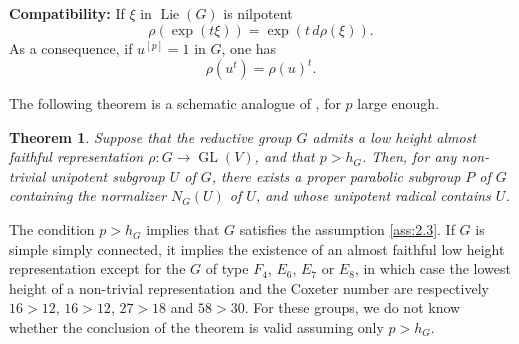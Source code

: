 \documentclass[11pt,a4paper]{article}
\theoremstyle{plain}
\newtheorem{theorem}{Theorem}[section]
\theoremstyle{definition}
\DeclareMathOperator{\Lie}{Lie}
\DeclareMathOperator{\GL}{GL}
\begin{document}
\subsection{} \label{sec:4.6}
\textbf{Compatibility:} If $\xi$ in $\Lie(G)$ is nilpotent
\begin{equation} \label{eq:4.6.1}
\rho(\exp(t\xi)) = \exp(t\, d\rho(\xi)).
\end{equation}
As a consequence, if $u^{[p]} = 1$ in $G$, one has
\begin{equation} \label{eq:4.6.2}
\rho(u^t) = \rho(u)^t.
\end{equation}

The following theorem is a schematic analogue of \cite{BT}, for $p$ large enough.

\begin{theorem} \label{thm:4.7}
Suppose that the reductive group $G$ admits a low height almost faithful representation $\rho : G \to \GL(V)$, and that $p > h_G$. Then, for any non-trivial unipotent subgroup $U$ of $G$, there exists a proper parabolic subgroup $P$ of $G$ containing the normalizer $N_G(U)$ of $U$, and whose unipotent radical contains $U$.
\end{theorem}

The condition $p > h_G$ implies that $G$ satisfies the assumption \ref{ass:2.3}. If $G$ is simple simply connected, it implies the existence of an almost faithful low height representation except for the $G$ of type $F_4$, $E_6$, $E_7$ or $E_8$, in which case the lowest height of a non-trivial representation and the Coxeter number are respectively $16 > 12$, $16 > 12$, $27 > 18$ and $58 > 30$. For these groups, we do not know whether the conclusion of the theorem is valid assuming only $p > h_G$.
\end{document}
